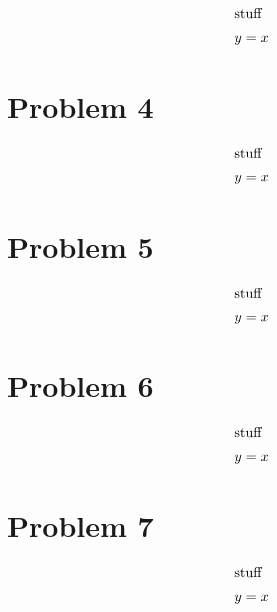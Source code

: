 \documentclass[12pt]{article}
\begin{document}
\begin{align} 
    \intertext{stuff}
    y&=x
\end{align}


\newpage
\section*{Problem 4}

\begin{align} 
    \intertext{stuff}
    y&=x
\end{align}



\newpage
\section*{Problem 5}

\begin{align} 
    \intertext{stuff}
    y&=x
\end{align}


\section*{Problem 6}

\begin{align} 
    \intertext{stuff}
    y&=x
\end{align}



\section*{Problem 7}

\begin{align} 
    \intertext{stuff}
    y&=x
\end{align}
\end{document}
